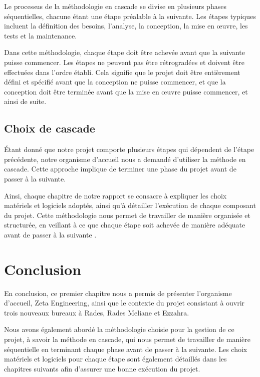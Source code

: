 Le processus de la méthodologie en cascade se divise en plusieurs phases séquentielles, chacune étant une étape préalable à la suivante. Les étapes typiques incluent la définition des besoins, l'analyse, la conception, la mise en œuvre, les tests et la maintenance.

Dans cette méthodologie, chaque étape doit être achevée avant que la suivante puisse commencer. Les étapes ne peuvent pas être rétrogradées et doivent être effectuées dans l'ordre établi. Cela signifie que le projet doit être entièrement défini et spécifié avant que la conception ne puisse commencer, et que la conception doit être terminée avant que la mise en œuvre puisse commencer, et ainsi de suite.



\subsection{Choix de cascade}

Étant donné que notre projet comporte plusieurs étapes qui dépendent de l'étape précédente, notre organisme d'accueil nous a demandé d'utiliser la méthode en cascade. Cette approche implique de terminer une phase du projet avant de passer à la suivante.


Ainsi, chaque chapitre de notre rapport se consacre à expliquer les choix matériels et logiciels adoptés, ainsi qu'à détailler l'exécution de chaque composant du projet. Cette méthodologie nous permet de travailler de manière organisée et structurée, en veillant à ce que chaque étape soit achevée de manière adéquate avant de passer à la suivante \cite{fagarasan2021agile} .




\section{Conclusion }
En conclusion, ce premier chapitre nous a permis de présenter l'organisme d'accueil, Zeta Engineering, ainsi que le contexte du projet consistant à ouvrir trois nouveaux bureaux à Rades, Rades Meliane et Ezzahra.

Nous avons également abordé la méthodologie choisie pour la gestion de ce projet, à savoir la méthode en cascade, qui nous permet de travailler de manière séquentielle en terminant chaque phase avant de passer à la suivante. Les choix matériels et logiciels pour chaque étape sont également détaillés dans les chapitres suivants afin d'assurer une bonne exécution du projet.